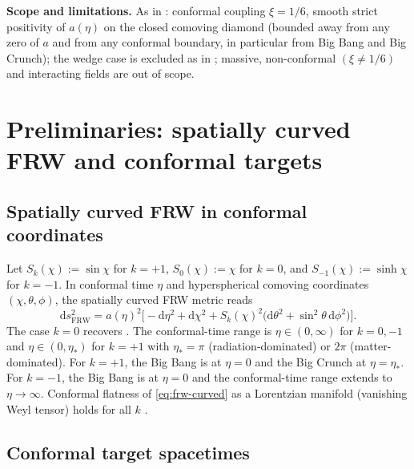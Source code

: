 \documentclass[11pt]{article}
\theoremstyle{definition}
\newcommand{\FRW}{\mathrm{FRW}}
\begin{document}
\noindent\textbf{Scope and limitations.} As in \cite{Remondiere2026}:
conformal coupling $\xi=1/6$, smooth strict positivity of $a(\eta)$ on the
closed comoving diamond (bounded away from any zero of $a$ and from any
conformal boundary, in particular from Big Bang and Big Crunch); the
wedge case is excluded as in \cite[Rem.~3.3]{Remondiere2026}; massive,
non-conformal $(\xi\ne 1/6)$ and interacting fields are out of scope.

\section{Preliminaries: spatially curved FRW and conformal targets}\label{sec:prelim}

\subsection{Spatially curved FRW in conformal coordinates}\label{sec:metric}

Let $S_k(\chi):=\sin\chi$ for $k=+1$, $S_0(\chi):=\chi$ for $k=0$, and
$S_{-1}(\chi):=\sinh\chi$ for $k=-1$. In conformal time $\eta$ and
hyperspherical comoving coordinates $(\chi,\theta,\phi)$, the spatially
curved FRW metric reads
\begin{equation}\label{eq:frw-curved}
\mathrm{d}s^2_\FRW
= a(\eta)^2\Big[-\mathrm{d}\eta^2 + \mathrm{d}\chi^2
  + S_k(\chi)^2\big(\mathrm{d}\theta^2 + \sin^2\theta\,\mathrm{d}\phi^2\big)\Big].
\end{equation}
The case $k=0$ recovers \cite[eq.~(1)]{Remondiere2026}. The conformal-time
range is $\eta\in(0,\infty)$ for $k=0,-1$ and $\eta\in(0,\eta_*)$ for $k=+1$
with $\eta_*=\pi$ (radiation-dominated) or $2\pi$ (matter-dominated). For
$k=+1$, the Big Bang is at $\eta=0$ and the Big Crunch at $\eta=\eta_*$. For
$k=-1$, the Big Bang is at $\eta=0$ and the conformal-time range extends to
$\eta\to\infty$. Conformal flatness of \eqref{eq:frw-curved} as a Lorentzian
manifold (vanishing Weyl tensor) holds for all $k$ \cite{IihoshiKetov2007,
Wald1994, PenroseRindler1986}.

\subsection{Conformal target spacetimes}\label{sec:targets}
\end{document}
